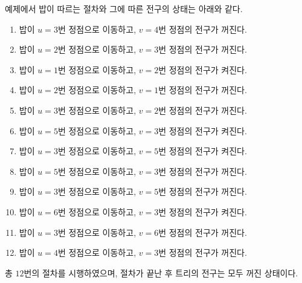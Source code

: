 예제에서 밥이 따르는 절차와 그에 따른 전구의 상태는 아래와 같다.

\begin{enumerate}
  \item 밥이 $u=3$번 정점으로 이동하고, $v=4$번 정점의 전구가 꺼진다.
  \item 밥이 $u=2$번 정점으로 이동하고, $v=3$번 정점의 전구가 꺼진다.
  \item 밥이 $u=1$번 정점으로 이동하고, $v=2$번 정점의 전구가 켜진다.
  \item 밥이 $u=2$번 정점으로 이동하고, $v=1$번 정점의 전구가 꺼진다.
  \item 밥이 $u=3$번 정점으로 이동하고, $v=2$번 정점의 전구가 꺼진다.
  \item 밥이 $u=5$번 정점으로 이동하고, $v=3$번 정점의 전구가 켜진다.
  \item 밥이 $u=3$번 정점으로 이동하고, $v=5$번 정점의 전구가 켜진다.
  \item 밥이 $u=5$번 정점으로 이동하고, $v=3$번 정점의 전구가 꺼진다.
  \item 밥이 $u=3$번 정점으로 이동하고, $v=5$번 정점의 전구가 꺼진다.
  \item 밥이 $u=6$번 정점으로 이동하고, $v=3$번 정점의 전구가 켜진다.
  \item 밥이 $u=3$번 정점으로 이동하고, $v=6$번 정점의 전구가 꺼진다.
  \item 밥이 $u=4$번 정점으로 이동하고, $v=3$번 정점의 전구가 꺼진다.
\end{enumerate}

총 $12$번의 절차를 시행하였으며, 절차가 끝난 후 트리의 전구는 모두 꺼진 상태이다.
